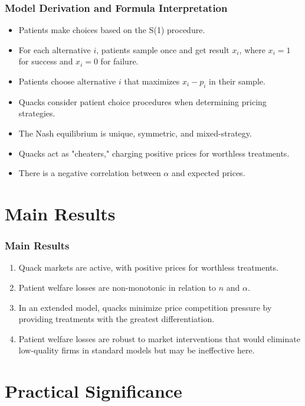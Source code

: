 \documentclass{beamer}
\begin{document}
	\begin{frame}
		\frametitle{Model Derivation and Formula Interpretation}
		\begin{itemize}
			\item Patients make choices based on the S(1) procedure.
			\item For each alternative \( i \), patients sample once and get result \( x_i \), where \( x_i = 1 \) for success and \( x_i = 0 \) for failure.
			\item Patients choose alternative \( i \) that maximizes \( x_i - p_i \) in their sample.
			\item Quacks consider patient choice procedures when determining pricing strategies.
			\item The Nash equilibrium is unique, symmetric, and mixed-strategy.
			\item Quacks act as "cheaters," charging positive prices for worthless treatments.
			\item There is a negative correlation between \( \alpha \) and expected prices.
		\end{itemize}
	\end{frame}
	
	\section{Main Results}
	
	\begin{frame}
		\frametitle{Main Results}
		\begin{enumerate}
			\item Quack markets are active, with positive prices for worthless treatments.
			\item Patient welfare losses are non-monotonic in relation to \( n \) and \( \alpha \).
			\item In an extended model, quacks minimize price competition pressure by providing treatments with the greatest differentiation.
			\item Patient welfare losses are robust to market interventions that would eliminate low-quality firms in standard models but may be ineffective here.
			\end{enumerate}
	\end{frame}
	
	\section{Practical Significance}
	
\end{document}
